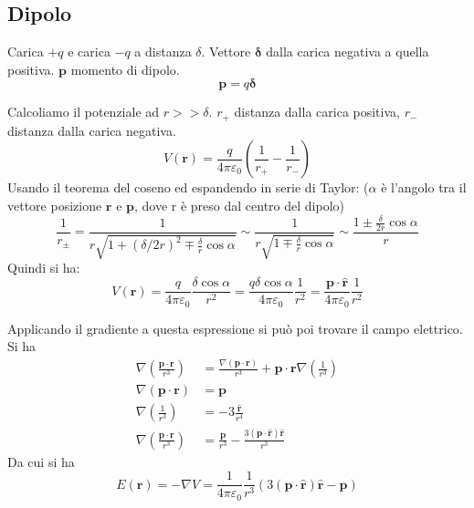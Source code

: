 \documentclass{article}
\renewcommand{\epsilon}{\varepsilon}
\newcommand{\mbf}{\mathbf}
\newcommand{\vers}[1]{\mbf{\hat #1 }}
\newcommand{\qpe}[1][1]{ \frac{ #1 }{ 4\pi\epsilon_0 } }
\numberwithin{equation}{section}
\begin{document}

\subsection{Dipolo} %
\label{sub:dipolo}

Carica $+q$ e carica $-q$ a distanza $\delta$. Vettore $\pmb \delta$ dalla carica negativa a quella positiva. $\mbf p$ momento di dipolo.
\begin{equation}
    \mbf p = q \pmb \delta
\end{equation}

Calcoliamo il potenziale ad $r >> \delta$. $r_+$ distanza dalla carica positiva, $r_-$ distanza dalla carica negativa. 
\begin{equation}
    V(\mbf r) = \qpe[q] \left ( \frac{ 1 }{ r_+ } - \frac{ 1 }{ r_- }  \right )
\end{equation}
Usando il teorema del coseno ed espandendo in serie di Taylor: ($\alpha$ è l'angolo tra il vettore posizione $\mbf r$ e $\mbf p$, dove r è preso dal centro del dipolo)
\begin{equation}
    \frac{ 1 }{ r_\pm } 
        = \frac{ 1 }{ r \sqrt{ 1 + (\delta/2r)^2 \mp \frac{\delta}{r} \cos \alpha} } 
        \sim \frac{ 1 }{ r \sqrt{ 1 \mp \frac{\delta}{r} \cos \alpha} } 
        \sim \frac{ 1 \pm \frac{\delta}{2r} \cos \alpha }{ r } 
\end{equation}
Quindi si ha:
\begin{equation}
    V(\mbf r) 
        = \qpe[q] \frac{ \delta \cos \alpha }{ r^2 } 
        = \qpe[q \delta \cos \alpha] \frac{ 1 }{ r^2 } 
        = \qpe[\mbf p \cdot \vers r] \frac{ 1 }{ r^2 } 
\end{equation}

Applicando il gradiente a questa espressione si può poi trovare il campo elettrico. Si ha 
\begin{align*}
    \nabla \left ( \frac{ \mbf p \cdot \mbf r }{ r^3 } \right ) 
    &= \frac{ \nabla(\mbf p \cdot \mbf r) }{ r^3 } + \mbf p \cdot \mbf r \nabla \left ( \frac{ 1 }{ r^3 } \right ) \\
    \nabla (\mbf p \cdot \mbf r) &= \mbf p \\
    \nabla \left ( \frac{ 1 }{ r^3 } \right ) &= -3 \frac{ \vers r }{ r^4 } \\
    \nabla \left ( \frac{ \mbf p \cdot \mbf r }{ r^3 } \right )  &= \frac{ \mbf p }{ r^3 } - \frac{ 3 ( \mbf p \cdot \vers r) \vers r}{ r^3 }
\end{align*}
Da cui si ha 
\begin{equation}
    E(\mbf r) = -\nabla V = \qpe \frac{ 1 }{ r^3 } ( 3 ( \mbf p \cdot \vers r) \vers r  -  \mbf p )
\end{equation}
\end{document}
